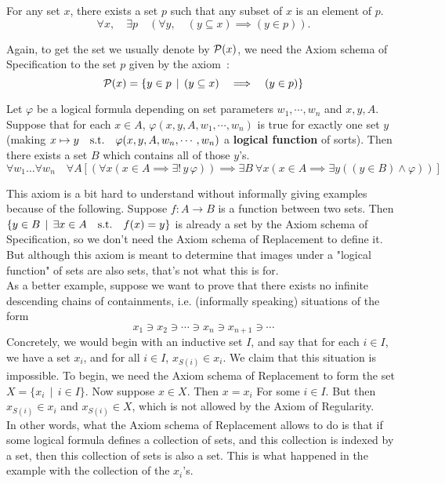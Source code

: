\begin{axiom} \label{axiom-of-power-set}
    For any set $x$, there exists a set $p$ such that any subset of $x$ is an element of $p$.
    \[
        \forall x, \quad \exists p \quad (\forall y, \quad (y \subseteq x) \implies (y \in p)).    
    \]
\end{axiom}

\begin{remark}
    Again, to get the set we usually denote by $\operatorname{\mathcal P}(x)$, we need the Axiom schema of Specification to the set $p$ given by the axiom~:
    \[
        \operatorname{\mathcal P}(x) = \{ y \in p \, \mid \, (y \subseteq x) \quad \Longrightarrow \quad (y \in p) \}    
    \]
\end{remark}

\begin{axiom} \label{axiom-schema-of-replacement}
    Let $\varphi$ be a logical formula depending on set parameters $w_1,\cdots,w_n$ and $x,y,A$. Suppose that for each $x \in A$, $\varphi(x,y,A,w_1,\cdots,w_n)$ is true for exactly one set $y$ (making $x \mapsto y \quad \text{s.t.} \quad \varphi(x,y,A,w_n,\cdots,w_n)$ a \textbf{logical function} of sorts). Then there exists a set $B$ which contains all of those $y$'s. 
    \[
        \forall w_1 \ldots \forall w_n \quad \forall A \left[ (\forall x( x \in A \implies \exists ! \, y \, \varphi)) \implies \exists B\ \forall x \left( x \in A \implies \exists y( (y \in B) \land \varphi )  \right) \right]
    \]
\end{axiom}

\begin{remark}
    This axiom is a bit hard to understand without informally giving examples because of the following. Suppose $f : A \to B$ is a function between two sets. Then $\{ y \in B \, \mid \, \exists x \in A \quad \text{s.t.} \quad f(x) = y \}$ is already a set by the Axiom schema of Specification, so we don't need the Axiom schema of Replacement to define it. But although this axiom is meant to determine that images under a "logical function" of sets are also sets, that's not what this is for. 
    \\

    As a better example, suppose we want to prove that there exists no infinite descending chains of containments, i.e. (informally speaking) situations of the form
    \[
        x_1 \ni x_2 \ni \cdots \ni x_n \ni x_{n+1} \ni \cdots    
    \]
    Concretely, we would begin with an inductive set $I$, and say that for each $i \in I$, we have a set $x_i$, and for all $i \in I$, $x_{S(i)} \in x_i$. We claim that this situation is impossible. To begin, we need the Axiom schema of Replacement to form the set $X = \{ x_i \, \mid \, i \in I \}$. Now suppose $x \in X$. Then $x = x_i$ For some $i \in I$. But then $x_{S(i)} \in x_i$ and $x_{S(i)} \in X$, which is not allowed by the Axiom of Regularity. 
    \\

    In other words, what the Axiom schema of Replacement allows to do is that if some logical formula defines a collection of sets, and this collection is indexed by a set, then this collection of sets is also a set. This is what happened in the example with the collection of the $x_i$'s. 
\end{remark}